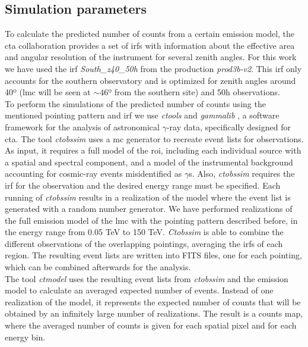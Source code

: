 \documentclass[main.tex]{subfiles}
\begin{document}
\subsection{Simulation parameters}

To calculate the predicted number of counts from a certain emission model, the \gls{cta} collaboration provides a set of \glspl{irf} \cite{CTAPerformance} with information about the effective area and angular resolution of the instrument for several zenith angles. For this work we have used the \gls{irf} \textit{South\_z40\_50h} from the production \textit{prod3b-v2}. This \gls{irf} only accounts for the southern observatory and is optimized for zenith angles around 40º (\gls{lmc} will be seen at $\sim 46$º from the southern site) and 50h observations. \\
To perform the simulations of the predicted number of counts using the mentioned pointing pattern and \gls{irf} we use \textit{ctools} and \textit{gammalib} \cite{2016Actools}, a software framework for the analysis of astronomical $\gamma$-ray data, specifically designed for \gls{cta}. The tool \textit{ctobssim} uses a \gls{mc} generator to recreate event lists for observations. As input, it requires a full model of the \gls{roi}, including each individual source with a spatial and spectral component, and a model of the instrumental background accounting for cosmic-ray events misidentified as $\gamma$s.
Also, \textit{ctobssim} requires the \gls{irf} for the observation and the desired energy range must be specified. Each running of \textit{ctobssim} results in a realization of the model where the event list is generated with a random number generator. We have performed realizations of the full emission model of the \gls{lmc} with the pointing pattern described before, in the energy range from 0.05 TeV to 150 TeV. \textit{Ctobssim} is able to combine the different observations of the overlapping pointings, averaging the \glspl{irf} of each region. The resulting event lists are written into FITS files, one for each pointing, which can be combined afterwards for the analysis.\\
The tool \textit{ctmodel} uses the resulting event lists from \textit{ctobssim} and the emission model to calculate an averaged expected number of events. Instead of one realization of the model, it represents the expected number of counts that will be obtained by an infinitely large number of realizations. The result is a counts map, where the averaged number of counts is given for each spatial pixel and for each energy bin.
\end{document}
